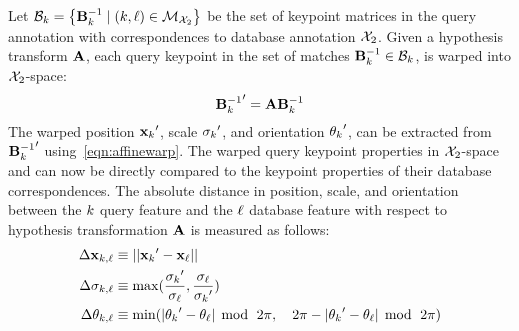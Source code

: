             Let $\mathcal{B}_{k} = \left\{{\mathbf{B}^{-1}_{k}} \mid (k,
              \ell) \in \mathcal{M}_{\mathcal{X}_{2}}\right\}$ be the set of keypoint
              matrices in the query annotation with correspondences to
              database annotation $\mathcal{X}_{2}$.
            Given a hypothesis transform $\mathbf{A}$, each query keypoint
              in the set of matches
            ${\mathbf{B}^{-1}_{k}} \in \mathcal{B}_{k}$, is warped into
              $\mathcal{X}_{2}$-space:
            \begin{equation}
                {{\ensuremath{\mathbf{B}}^{-1}_{k}}}' = \mathbf{A} {\mathbf{B}^{-1}_{k}}
            \end{equation}
            The warped position ${{\mathbf{x}_{k}}}'$, scale ${{\sigma_{k}}}'$,
              and orientation ${{\theta_{k}}}'$, can be extracted from
              ${{\mathbf{B}^{-1}_{k}}}'$ using~\cref{eqn:affinewarp}.
            The warped query keypoint properties in $\mathcal{X}_{2}$-space
              and can now be directly compared to the keypoint properties
              of their database correspondences.
            The absolute distance in position, scale, and orientation
              between the $k$\th{} query feature and the
              $\ell$\th{} database feature with respect to hypothesis
              transformation $\mathbf{A}$ is measured as follows:
            \begin{equation}\label{eqn:inlierdelta}
                \begin{aligned}
                    \Delta \mathbf{x}_{k, \ell}     & \equiv  ||{{\mathbf{x}_{k}}}' - {\mathbf{x}_{\ell}}||_{}\\
                    \Delta \sigma_{k, \ell}  & \equiv  \max(
                        \frac{{{\sigma_{k}}}'}{{\sigma_{\ell}}},
                        \frac{{\sigma_{\ell}}}{{{\sigma_{k}}}'}) \\
                    \Delta \theta_{k, \ell}    & \equiv  \min(
                        |{{\theta_{k}}}' - {\theta_{\ell}}|\; \operatorname{mod}{} \;\,2\pi,\quad 
                        2\pi - |{{\theta_{k}}}' - {\theta_{\ell}}|\; \operatorname{mod}{} \;\,2\pi)
                \end{aligned}
            \end{equation}

